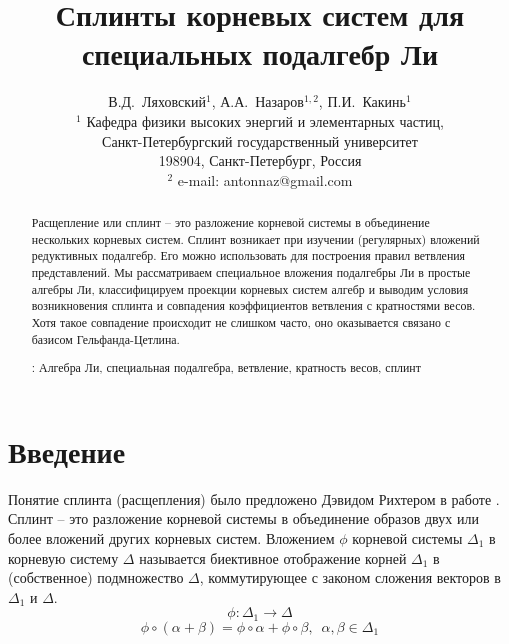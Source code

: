 \documentclass[12pt]{article}
\begin{document}
\title{Сплинты корневых систем для специальных подалгебр Ли}

\author{В.Д.~Ляховский$^1$, А.А.~Назаров$^{1,2}$, П.И.~Какинь$^{1}$\\
  {\small $^1$ Кафедра физики высоких энергий и элементарных частиц,}\\ {\small Санкт-Петербургский государственный университет}\\
  {\small 198904, Санкт-Петербург, Россия}\\
  {\small $^{2}$ e-mail: antonnaz@gmail.com}}
\date{}

\maketitle

\begin{abstract}
  Расщепление или сплинт -- это разложение корневой системы в объединение нескольких корневых
  систем. Сплинт возникает при изучении (регулярных) вложений редуктивных подалгебр. Его можно
  использовать для построения правил ветвления представлений. Мы рассматриваем специальное вложения
  подалгебры Ли в простые алгебры Ли, классифицируем проекции корневых систем алгебр и выводим
  условия возникновения сплинта и совпадения коэффициентов ветвления с кратностями весов. Хотя
  такое совпадение происходит не слишком часто, оно оказывается связано с базисом Гельфанда-Цетлина. 

: Алгебра Ли, специальная подалгебра, ветвление, кратность весов, сплинт
\end{abstract}


\section{Введение}
\label{sec:introduction}

Понятие сплинта (расщепления) было предложено Дэвидом Рихтером в работе \cite{richter2008splints}.
Сплинт -- это разложение корневой системы в объединение образов двух или более вложений других
корневых систем. Вложением  $\phi$ корневой системы $\Delta_1$ в корневую систему $\Delta$
называется биективное отображение корней $\Delta_{1}$ в (собственное) подмножество  $\Delta$,
коммутирующее с  законом сложения векторов в $\Delta_{1}$ и $\Delta$.
\begin{equation*}
\phi:\Delta_1 \longrightarrow \Delta
\end{equation*}
\begin{equation*}
\phi \circ (\alpha + \beta) =\phi \circ \alpha + \phi \circ \beta,
\,\,\, \alpha,\beta \in \Delta_1
\end{equation*}
\end{document}
